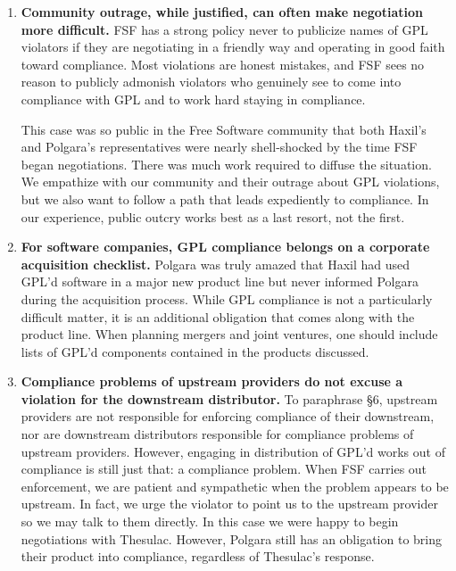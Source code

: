 \documentclass[12pt]{report}
\begin{document}
\begin{enumerate}

\item {\bf Community outrage, while justified, can often make negotiation
  more difficult.}  FSF has a strong policy never to publicize names of
  GPL violators if they are negotiating in a friendly way and operating in
  good faith toward compliance.  Most violations are honest mistakes, and
  FSF sees no reason to publicly admonish violators who genuinely see to
  come into compliance with GPL and to work hard staying in compliance.

  This case was so public in the Free Software community that both Haxil's
  and Polgara's representatives were nearly shell-shocked by the time FSF
  began negotiations.  There was much work required to diffuse the
  situation.  We empathize with our community and their outrage about GPL
  violations, but we also want to follow a path that leads expediently
  to compliance.  In our experience, public outcry works best as a last
  resort, not the first.

\item {\bf For software companies, GPL compliance belongs on a corporate
  acquisition checklist. }  Polgara was truly amazed that Haxil had used
  GPL'd software in a major new product line but never informed Polgara
  during the acquisition process.  While GPL compliance is not a
  particularly difficult matter, it is an additional obligation that comes
  along with the product line.  When planning mergers and joint ventures,
  one should include lists of GPL'd components contained in the products
  discussed.

\item {\bf Compliance problems of upstream providers do not excuse a
  violation for the downstream distributor.}  To paraphrase \S 6, upstream
  providers are not responsible for enforcing compliance of their
  downstream, nor are downstream distributors responsible for compliance
  problems of upstream providers.  However, engaging in distribution of
  GPL'd works out of compliance is still just that: a compliance problem.
  When FSF carries out enforcement, we are patient and sympathetic when
  the problem appears to be upstream.  In fact, we urge the violator to
  point us to the upstream provider so we may talk to them directly.  In
  this case we were happy to begin negotiations with Thesulac.  However,
  Polgara still has an obligation to bring their product into compliance,
  regardless of Thesulac's response.


\end{enumerate}
\end{document}
